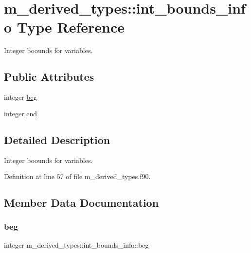 \hypertarget{structm__derived__types_1_1int__bounds__info}{}\section{m\+\_\+derived\+\_\+types\+:\+:int\+\_\+bounds\+\_\+info Type Reference}
\label{structm__derived__types_1_1int__bounds__info}


Integer boounds for variables.  


\subsection*{Public Attributes}
\begin{DoxyCompactItemize}
\item 
integer \hyperlink{structm__derived__types_1_1int__bounds__info_aaa4094287c0902dc08f0256b91ce80c3}{beg}
\item 
integer \hyperlink{structm__derived__types_1_1int__bounds__info_aaf13834e181a2f6618008592ae58df70}{end}
\end{DoxyCompactItemize}


\subsection{Detailed Description}
Integer boounds for variables. 

Definition at line 57 of file m\+\_\+derived\+\_\+types.\+f90.



\subsection{Member Data Documentation}
\mbox{\label{structm__derived__types_1_1int__bounds__info_aaa4094287c0902dc08f0256b91ce80c3}} 
\subsubsection{\texorpdfstring{beg}{beg}}
{\footnotesize\ttfamily integer m\+\_\+derived\+\_\+types\+::int\+\_\+bounds\+\_\+info\+::beg}



